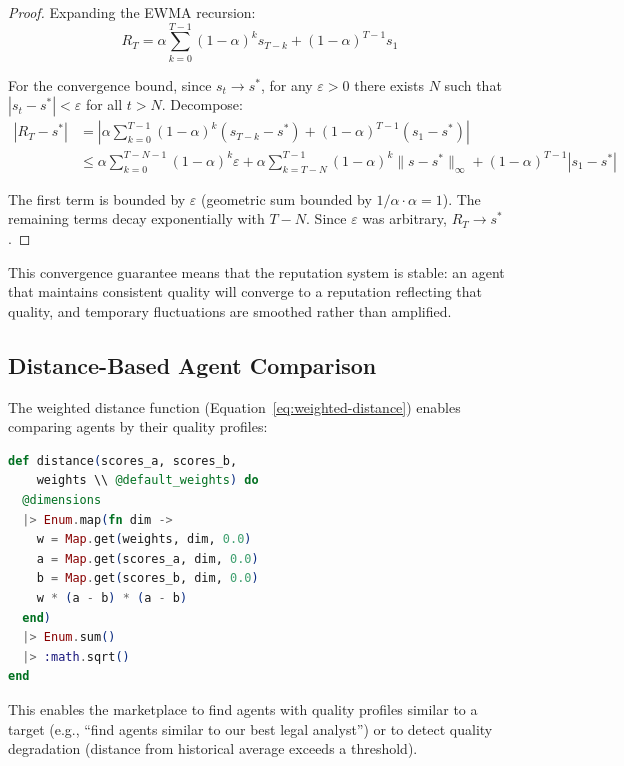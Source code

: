 \documentclass[12pt,a4paper]{article}
\theoremstyle{definition}
\theoremstyle{remark}
\begin{document}
\begin{proof}
Expanding the EWMA recursion:
\begin{equation}
  R_T = \alpha \sum_{k=0}^{T-1} (1-\alpha)^k s_{T-k} + (1-\alpha)^{T-1} s_1
\end{equation}

For the convergence bound, since $s_t \to s^*$, for any $\varepsilon > 0$ there exists $N$ such that $|s_t - s^*| < \varepsilon$ for all $t > N$. Decompose:
\begin{align}
  |R_T - s^*| &= \left| \alpha \sum_{k=0}^{T-1} (1-\alpha)^k (s_{T-k} - s^*) + (1-\alpha)^{T-1}(s_1 - s^*) \right| \\
  &\leq \alpha \sum_{k=0}^{T-N-1} (1-\alpha)^k \varepsilon + \alpha \sum_{k=T-N}^{T-1} (1-\alpha)^k \|s - s^*\|_\infty + (1-\alpha)^{T-1} |s_1 - s^*|
\end{align}

The first term is bounded by $\varepsilon$ (geometric sum bounded by $1/\alpha \cdot \alpha = 1$). The remaining terms decay exponentially with $T - N$. Since $\varepsilon$ was arbitrary, $R_T \to s^*$.
\end{proof}

This convergence guarantee means that the reputation system is stable: an agent that maintains consistent quality will converge to a reputation reflecting that quality, and temporary fluctuations are smoothed rather than amplified.

\subsection{Distance-Based Agent Comparison}

The weighted distance function (Equation~\ref{eq:weighted-distance}) enables comparing agents by their quality profiles:

\begin{lstlisting}[language=elixir, caption={Weighted distance for agent comparison (from \texttt{evaluator.ex})}, label={lst:distance}]
def distance(scores_a, scores_b,
    weights \\ @default_weights) do
  @dimensions
  |> Enum.map(fn dim ->
    w = Map.get(weights, dim, 0.0)
    a = Map.get(scores_a, dim, 0.0)
    b = Map.get(scores_b, dim, 0.0)
    w * (a - b) * (a - b)
  end)
  |> Enum.sum()
  |> :math.sqrt()
end
\end{lstlisting}

This enables the marketplace to find agents with quality profiles similar to a target (e.g., ``find agents similar to our best legal analyst'') or to detect quality degradation (distance from historical average exceeds a threshold).
\end{document}
